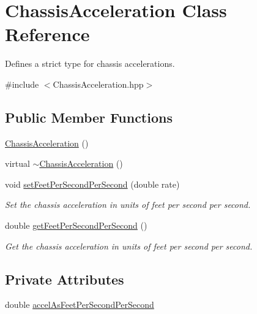 \hypertarget{classChassisAcceleration}{\section{Chassis\-Acceleration Class Reference}
\label{classChassisAcceleration}
}


Defines a strict type for chassis accelerations.  




{\ttfamily \#include $<$Chassis\-Acceleration.\-hpp$>$}

\subsection*{Public Member Functions}
\begin{DoxyCompactItemize}
\item 
\hyperlink{classChassisAcceleration_ab9e855b72a13b866a8714f13b51e5bde}{Chassis\-Acceleration} ()
\item 
virtual \hyperlink{classChassisAcceleration_a0a84af4dabd88073dcb19310b6c2f659}{$\sim$\-Chassis\-Acceleration} ()
\item 
void \hyperlink{classChassisAcceleration_a0bce2e1bf6f69cd2b68e51a414e9c733}{set\-Feet\-Per\-Second\-Per\-Second} (double rate)
\begin{DoxyCompactList}\small\item\em Set the chassis acceleration in units of feet per second per second. \end{DoxyCompactList}\item 
double \hyperlink{classChassisAcceleration_ac11174dd8972a150b63efdc1edc90891}{get\-Feet\-Per\-Second\-Per\-Second} ()
\begin{DoxyCompactList}\small\item\em Get the chassis acceleration in units of feet per second per second. \end{DoxyCompactList}\end{DoxyCompactItemize}
\subsection*{Private Attributes}
\begin{DoxyCompactItemize}
\item 
double \hyperlink{classChassisAcceleration_aa63f0c95976ff343f461c68616629c3d}{accel\-As\-Feet\-Per\-Second\-Per\-Second}
\end{DoxyCompactItemize}


